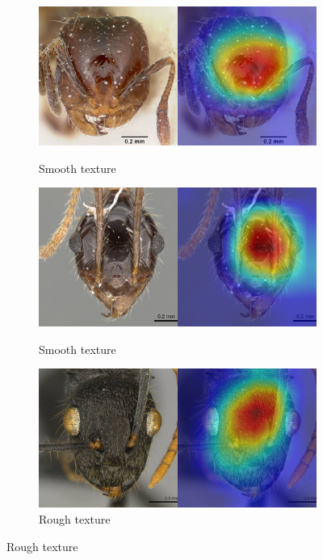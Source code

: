 \documentclass{aci}
\numberwithin{equation}{section}
\begin{document}
\newcommand{\subwidth}{0.35\textwidth}
\begin{figure}
    \centering
    \begin{subfigure}{\subwidth}
        \caption*{Smooth texture}
        \includegraphics[width=1\linewidth]{thesis_assets/gradcam/correct_ideal/518.png}
        \label{fig:correct_ideal_518}
    \end{subfigure}
    \begin{subfigure}{\subwidth}
        \caption*{Smooth texture}
        \includegraphics[width=1\linewidth]{thesis_assets/gradcam/correct_ideal/808.png}
        \label{fig:correct_ideal_808}
    \end{subfigure}
    \begin{subfigure}{\subwidth}
        \caption*{Rough texture}
        \includegraphics[width=1\linewidth]{thesis_assets/gradcam/correct_ideal/842.png}

\end{subfigure}
\end{figure}
\end{document}

